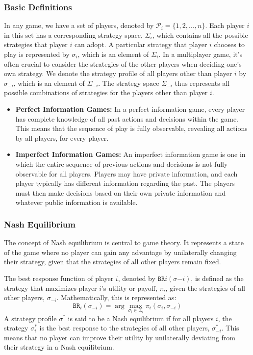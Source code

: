 \documentclass[11pt]{article}
\begin{document}
\subsubsection{Basic Definitions}
In any game, we have a set of players, denoted by $\mathcal{P}_i=\{1,2,...,n\}$. Each player $i$ in this set has a corresponding strategy space, $\Sigma_i$, which contains all the possible strategies that player $i$ can adopt. A particular strategy that player $i$ chooses to play is represented by $\sigma_i$, which is an element of $\Sigma_i$.
In a multiplayer game, it's often crucial to consider the strategies of the other players when deciding one's own strategy. We denote the strategy profile of all players other than player $i$ by $\sigma_{-i}$, which is an element of $\Sigma_{-i}$. The strategy space $\Sigma_{-i}$ thus represents all possible combinations of strategies for the players other than player $i$.
\begin{itemize}
  \item \textbf{Perfect Information Games:} In a perfect information game, every player has complete knowledge of all past actions and decisions within the game. This means that the sequence of play is fully observable, revealing all actions by all players, for every player.
  \item \textbf{Imperfect Information Games:} An imperfect information game is one in which the entire sequence of previous actions and decisions is not fully observable for all players. Players may have private information, and each player typically has different information regarding the past. The players must then make decisions based on their own private information and whatever public information is available.
  \end{itemize}

\subsubsection{Nash Equilibrium}
The concept of Nash equilibrium is central to game theory. It represents a state of the game where no player can gain any advantage by unilaterally changing their strategy, given that the strategies of all other players remain fixed.

The best response function of player $i$, denoted by $\texttt{BR}i(\sigma{-i})$, is defined as the strategy that maximizes player $i$'s utility or payoff, $\pi_i$, given the strategies of all other players, $\sigma_{-i}$. Mathematically, this is represented as:
\begin{equation}
\texttt{BR}_i(\sigma_{-i}) = \arg\max_{\sigma_i \in \Sigma_i} \pi_i(\sigma_i,\sigma_{-i})
\end{equation}
A strategy profile $\sigma^*$ is said to be a Nash equilibrium if for all players $i$, the strategy $\sigma_i^*$ is the best response to the strategies of all other players, $\sigma_{-i}^*$. This means that no player can improve their utility by unilaterally deviating from their strategy in a Nash equilibrium.
\end{document}
